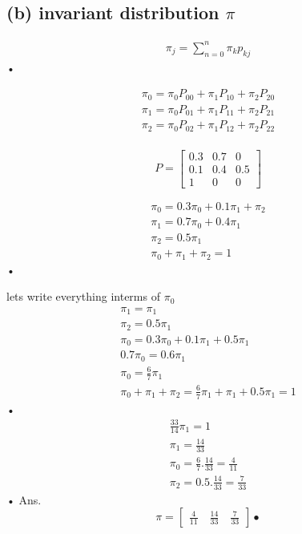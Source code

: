 \documentclass[a4paper,11pt]{article}
\begin{document}
\subsection*{(b) invariant distribution $\pi$ }
\begin{eqnarray}
\pi_j = \sum_{n=0}^{n} \pi_k p_{kj}
\end{eqnarray}•

\begin{eqnarray}
\pi_0 = \pi_0 P_{00} + \pi_1 P_{10} + \pi_2 P_{20}\\
\pi_1 = \pi_0 P_{01} + \pi_1 P_{11} + \pi_2 P_{21}\\
\pi_2 = \pi_0 P_{02} + \pi_1 P_{12} + \pi_2 P_{22}\\
\end{eqnarray}


$$
P=\begin{bmatrix} 
0.3 & 0.7 & 0 \\
0.1 & 0.4 & 0.5\\
1    & 0     &0
\end{bmatrix}
$$


\begin{eqnarray}
\pi_0 = 0.3\pi_0+ 0.1\pi_1 + \pi_2 \\
\pi_1 = 0.7\pi_0+ 0.4\pi_1  \\
\pi_2 = 0.5\pi_1\\ 
\pi_0+\pi_1+\pi_2 = 1
\end{eqnarray}•

lets write everything interms of $\pi_0$\\
\begin{eqnarray}
\pi_1=\pi_1\\
\pi_2=0.5\pi_1\\
\pi_0 = 0.3\pi_0+0.1\pi_1+0.5\pi_1\\
0.7\pi_0=0.6\pi_1\\
\pi_0 = \frac{6}{7}\pi_1\\
\pi_0+\pi_1+\pi_2=\frac{6}{7}\pi_1+\pi_1+0.5\pi_1=1
\end{eqnarray}•
\begin{eqnarray}
\frac{33}{14}\pi_1=1\\
\pi_1=\frac{14}{33}\\
\pi_0=\frac{6}{7}.\frac{14}{33}=\frac{4}{11}\\
\pi_2=0.5.\frac{14}{33}=\frac{7}{33}
\end{eqnarray}•
Ans.
$$
\pi = \begin{bmatrix}
\frac{4}{11} \quad \frac{14}{33}\quad \frac{7}{33}   
\end{bmatrix}•
$$
\end{document}
